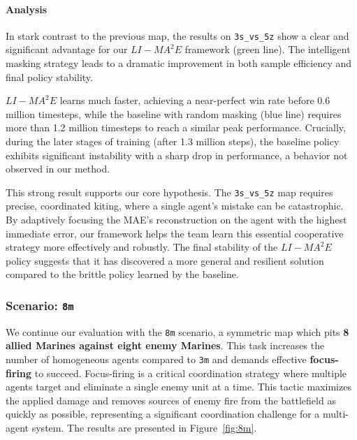 \paragraph{Analysis}
In stark contrast to the previous map, the results on \texttt{3s\_vs\_5z} show a clear and significant advantage for our $LI-{MA}^2E$ framework (green line). The intelligent masking strategy leads to a dramatic improvement in both sample efficiency and final policy stability.

$LI-{MA}^2E$ learns much faster, achieving a near-perfect win rate before 0.6 million timesteps, while the baseline with random masking (blue line) requires more than 1.2 million timesteps to reach a similar peak performance. Crucially, during the later stages of training (after 1.3 million steps), the baseline policy exhibits significant instability with a sharp drop in performance, a behavior not observed in our method.

This strong result supports our core hypothesis. The \texttt{3s\_vs\_5z} map requires precise, coordinated kiting, where a single agent's mistake can be catastrophic. By adaptively focusing the MAE's reconstruction on the agent with the highest immediate error, our framework helps the team learn this essential cooperative strategy more effectively and robustly. The final stability of the $LI-{MA}^2E$ policy suggests that it has discovered a more general and resilient solution compared to the brittle policy learned by the baseline.

\subsubsection{Scenario: \texttt{8m}}
We continue our evaluation with the \texttt{8m} scenario, a symmetric map which pits \textbf{8 allied Marines against eight enemy Marines}. This task increases the number of homogeneous agents compared to \texttt{3m} and demands effective \textbf{focus-firing} to succeed. Focus-firing is a critical coordination strategy where multiple agents target and eliminate a single enemy unit at a time. This tactic maximizes the applied damage and removes sources of enemy fire from the battlefield as quickly as possible, representing a significant coordination challenge for a multi-agent system. The results are presented in Figure~\ref{fig:8m}.

